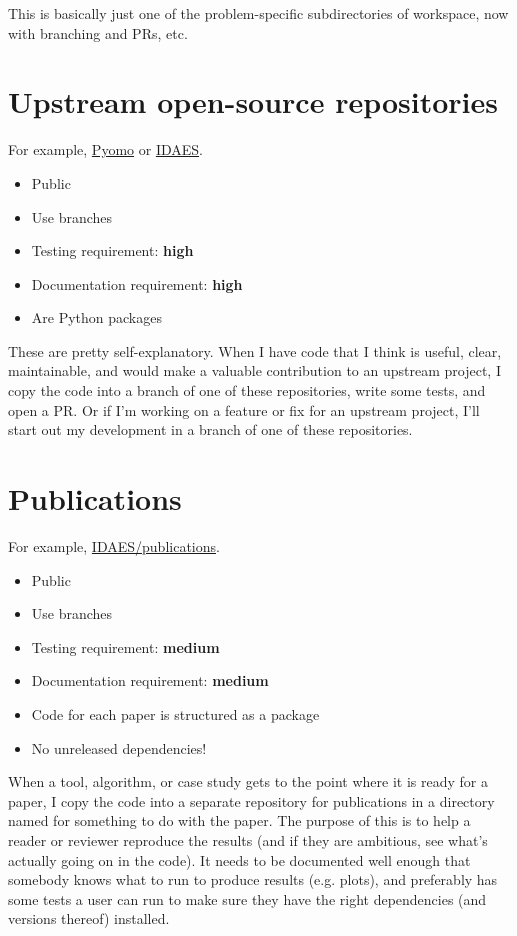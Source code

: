 \documentclass{article}
\begin{document}
This is basically just one of the problem-specific subdirectories of
workspace, now with branching and PRs, etc.

\section{Upstream open-source repositories}
For example, \href{https://github.com/pyomo/pyomo}{Pyomo} or
\href{https://github.com/idaes/idaes-pse}{IDAES}.
\begin{itemize}
  \item Public
  \item Use branches
  \item Testing requirement: {\color{red}\bf high}
  \item Documentation requirement: {\color{red}\bf high}
  \item Are Python packages
\end{itemize}

These are pretty self-explanatory. When I have code that I think
is useful, clear, maintainable, and would make a valuable
contribution to an upstream project, I copy the code into a branch
of one of these repositories, write some tests, and open a PR.
Or if I'm working on a feature or fix for an upstream project,
I'll start out my development in a branch of one of these
repositories.

\section{Publications}
For example, \href{https://github.com/idaes/publications}{IDAES/publications}.
\begin{itemize}
  \item Public
  \item Use branches
  \item Testing requirement: {\color{purple}\bf medium}
  \item Documentation requirement: {\color{purple}\bf medium}
  \item Code for each paper is structured as a package
  \item No unreleased dependencies!
\end{itemize}

When a tool, algorithm, or case study gets to the point where it is
ready for a paper, I copy the code into a separate repository for
publications in a directory named for something to do with the paper.
The purpose of this is to help a reader or reviewer reproduce the
results (and if they are ambitious, see what's actually going on
in the code).
It needs to be documented well enough that somebody knows what to run
to produce results (e.g. plots), and preferably has some tests a
user can run to make sure they have the right dependencies
(and versions thereof) installed.
\end{document}
